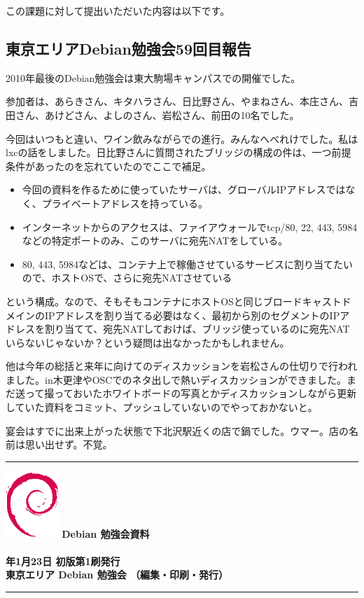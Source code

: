 \documentclass[mingoth,a4paper]{jsarticle}
\newcommand{\debmtgyear}{2010}
\newcommand{\debmtgmonth}{1}
\newcommand{\debmtgdate}{23}
\begin{document}
この課題に対して提出いただいた内容は以下です。



\subsection{東京エリアDebian勉強会59回目報告}


2010年最後のDebian勉強会は東大駒場キャンパスでの開催でした。

参加者は、あらきさん、キタハラさん、日比野さん、やまねさん、本庄さん、吉田さん、あけどさん、よしのさん、岩松さん、前田の10名でした。

今回はいつもと違い、ワイン飲みながらでの進行。みんなへべれけでした。私はlxcの話をしました。日比野さんに質問されたブリッジの構成の件は、一つ前提条件があったのを忘れていたのでここで補足。
\begin{itemize}
 \item 今回の資料を作るために使っていたサーバは、グローバルIPアドレスではなく、プライベートアドレスを持っている。
 \item インターネットからのアクセスは、ファイアウォールでtcp/80, 22, 443, 5984などの特定ポートのみ、このサーバに宛先NATをしている。
 \item 80, 443, 5984などは、コンテナ上で稼働させているサービスに割り当てたいので、ホストOSで、さらに宛先NATさせている
\end{itemize}

という構成。なので、そもそもコンテナにホストOSと同じブロードキャストドメインのIPアドレスを割り当てる必要はなく、最初から別のセグメントのIPアドレスを割り当てて、宛先NATしておけば、ブリッジ使っているのに宛先NATいらないじゃないか？という疑問は出なかったかもしれません。

他は今年の総括と来年に向けてのディスカッションを岩松さんの仕切りで行われました。in木更津やOSCでのネタ出しで熱いディスカッションができました。まだ送って撮っておいたホワイトボードの写真とかディスカッションしながら更新していた資料をコミット、プッシュしていないのでやっておかないと。

宴会はすでに出来上がった状態で下北沢駅近くの店で鍋でした。ウマー。店の名前は思い出せず。不覚。



\cleartooddpage

\vspace*{15cm}
\hrule
\vspace{2mm}
\includegraphics[width=2cm]{image200502/openlogo-nd.eps}
\noindent \Large \bf Debian 勉強会資料\\ \\
\noindent \normalfont \debmtgyear{}年\debmtgmonth{}月\debmtgdate{}日 \hspace{5mm}  初版第1刷発行\\
\noindent \normalfont 東京エリア Debian 勉強会 （編集・印刷・発行）\\
\hrule
\end{document}
